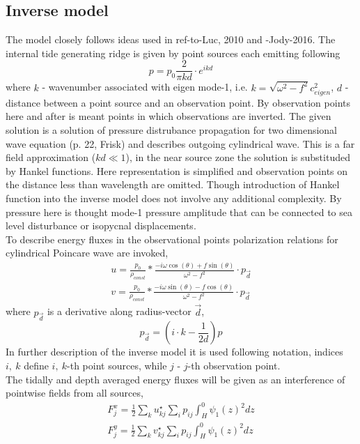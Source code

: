 \documentclass[12pt]{article}
\begin{document}
\subsection{Inverse model}
The model closely follows ideas used in ref-to-Luc, 2010 and -Jody-2016. The internal tide generating ridge is given by point sources each emitting following
\begin{equation} \label{invm_eq:1}
p = p_{0} \frac{2}{\pi k d} \cdot e^{i  k  d}
\end{equation}
where $k$ - wavenumber associated with eigen mode-1, i.e. $k = \sqrt{\omega ^ 2 - f ^ 2}{c_{eigen} ^ 2}$, $d$ - distance between a point source and an observation point. By observation points here and after is meant points in which observations are inverted. The given solution is a solution of pressure distrubance propagation for two dimensional wave equation (p. 22, Frisk) and describes outgoing cylindrical wave. This is a far field approximation ($kd \ll 1$), in the near source zone the solution is substituded by Hankel functions. Here representation is simplified and observation points on the distance less than wavelength are omitted. Though introduction of Hankel function into the inverse model does not involve any additional complexity. By pressure here is thought mode-1 pressure amplitude that can be connected to sea level disturbance or isopycnal displacements.\\
To describe energy fluxes in the observational points polarization relations for cylindrical Poincare wave are invoked,
\begin{align} \label{invm_eq:2}
u = \frac{p_{0}}{\rho_{const}} * \frac{-i \omega \cos(\theta) + f \sin(\theta)}{\omega ^ 2 - f ^ 2} \cdot p_{\vec{d}}\\
v = \frac{p_{0}}{\rho_{const}} * \frac{-i \omega \sin(\theta) - f \cos(\theta)}{\omega ^ 2 - f ^ 2} \cdot p_{\vec{d}}
\end{align}
where $p_{\vec{d}}$ is a derivative along radius-vector $\vec{d}$,
\begin{equation}
p_{\vec{d}} = (i \cdot k - \frac{1}{2 d}) p
\end{equation}
In further description of the inverse model it is used following notation, indices $i,~k$ define $i,~k$-th point sources, while $j$ - $j$-th observation point.\\
The tidally and depth averaged energy fluxes will be given as an interference of pointwise fields from all sources,
\begin{align}
F_{j}^x = \frac{1}{2} \sum_k u_{kj}^{\star} \sum_i p_{ij} \int_H^0 \psi_1(z)^2 dz\\
F_{j}^y = \frac{1}{2} \sum_k v_{kj}^{\star} \sum_i p_{ij} \int_H^0 \psi_1(z)^2 dz
\end{align}
\end{document}
